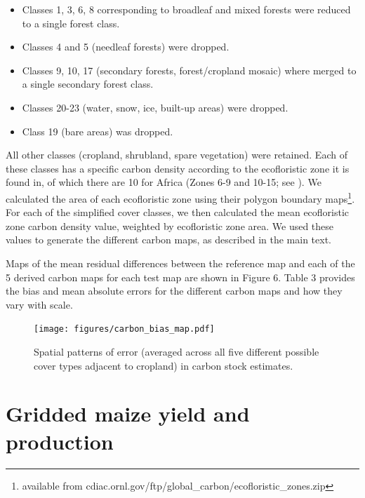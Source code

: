 \documentclass[11pt, titlepage]{article}
\begin{document}
\begin{itemize}
\item Classes 1, 3, 6, 8 corresponding to broadleaf and mixed forests were reduced to a single forest class.
\item Classes 4 and 5 (needleaf forests) were dropped. 
\item Classes 9, 10, 17 (secondary forests, forest/cropland mosaic) where merged to a single secondary forest class.
\item Classes 20-23 (water, snow, ice, built-up areas) were dropped.
\item Class 19 (bare areas) was dropped.
\end{itemize}

All other classes (cropland, shrubland, spare vegetation) were retained. Each of these classes has a specific carbon density according to the ecofloristic zone it is found in, of which there are 10 for Africa (Zones 6-9 and 10-15; see \cite{ruesch_new_2008}). We calculated the area of each ecofloristic zone using their polygon boundary maps\footnote{available from cdiac.ornl.gov/ftp/global\_carbon/ecofloristic\_zones.zip}. For each of the simplified cover classes, we then calculated the mean ecofloristic zone carbon density value, weighted by ecofloristic zone area. We used these values to generate the different carbon maps, as described in the main text.  

Maps of the mean residual differences between the reference map and each of the 5 derived carbon maps for each test map are shown in Figure 6. Table 3 provides the bias and mean absolute errors for the different carbon maps and how they vary with scale.  

\begin{figure}[!ht]
  \centering
     \texttt{[image: figures/carbon\_bias\_map.pdf]} 
      \caption{Spatial patterns of error (averaged across all five different possible cover types adjacent to cropland) in carbon stock estimates. }
      \label{fig:default}
\end{figure}

%

\FloatBarrier


\clearpage
\section{\large Gridded maize yield and production}
\end{document}
